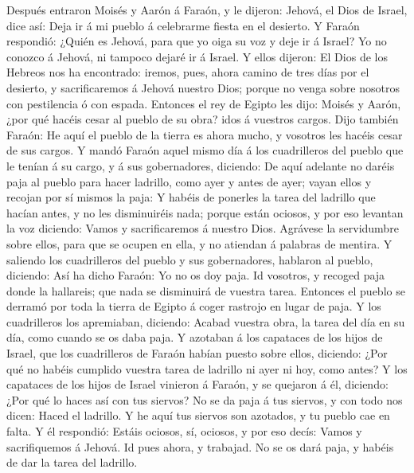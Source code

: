  Después entraron Moisés y Aarón á Faraón, y le dijeron:
Jehová, el Dios de Israel, dice así: Deja ir á mi pueblo á celebrarme
fiesta en el desierto.  Y Faraón respondió: ¿Quién es
Jehová, para que yo oiga su voz y deje ir á Israel? Yo no conozco á
Jehová, ni tampoco dejaré ir á Israel.  Y ellos dijeron:
El Dios de los Hebreos nos ha encontrado: iremos, pues, ahora camino de
tres días por el desierto, y sacrificaremos á Jehová nuestro Dios;
porque no venga sobre nosotros con pestilencia ó con espada.
 Entonces el rey de Egipto les dijo: Moisés y Aarón, ¿por
qué hacéis cesar al pueblo de su obra? idos á vuestros cargos.
 Dijo también Faraón: He aquí el pueblo de la tierra es
ahora mucho, y vosotros les hacéis cesar de sus cargos.  Y
mandó Faraón aquel mismo día á los cuadrilleros del pueblo que le tenían
á su cargo, y á sus gobernadores, diciendo:  De aquí
adelante no daréis paja al pueblo para hacer ladrillo, como ayer y antes
de ayer; vayan ellos y recojan por sí mismos la paja:  Y
habéis de ponerles la tarea del ladrillo que hacían antes, y no les
disminuiréis nada; porque están ociosos, y por eso levantan la voz
diciendo: Vamos y sacrificaremos á nuestro Dios.  Agrávese
la servidumbre sobre ellos, para que se ocupen en ella, y no atiendan á
palabras de mentira.  Y saliendo los cuadrilleros del
pueblo y sus gobernadores, hablaron al pueblo, diciendo: Así ha dicho
Faraón: Yo no os doy paja.  Id vosotros, y recoged paja
donde la hallareis; que nada se disminuirá de vuestra tarea.
 Entonces el pueblo se derramó por toda la tierra de
Egipto á coger rastrojo en lugar de paja.  Y los
cuadrilleros los apremiaban, diciendo: Acabad vuestra obra, la tarea del
día en su día, como cuando se os daba paja.  Y azotaban á
los capataces de los hijos de Israel, que los cuadrilleros de Faraón
habían puesto sobre ellos, diciendo: ¿Por qué no habéis cumplido vuestra
tarea de ladrillo ni ayer ni hoy, como antes?  Y los
capataces de los hijos de Israel vinieron á Faraón, y se quejaron á él,
diciendo: ¿Por qué lo haces así con tus siervos?  No se
da paja á tus siervos, y con todo nos dicen: Haced el ladrillo. Y he
aquí tus siervos son azotados, y tu pueblo cae en falta. 
Y él respondió: Estáis ociosos, sí, ociosos, y por eso decís: Vamos y
sacrifiquemos á Jehová.  Id pues ahora, y trabajad. No se
os dará paja, y habéis de dar la tarea del ladrillo. 
